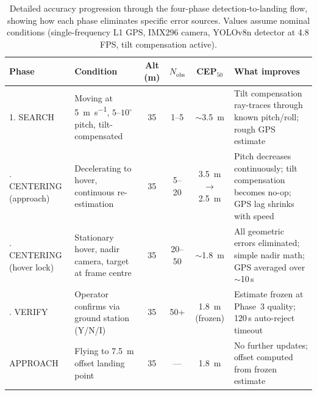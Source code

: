 \begin{table}[ht]
  \centering
  \caption{Detailed accuracy progression through the four-phase detection-to-landing flow, showing how each phase eliminates specific error sources.  Values assume nominal conditions (single-frequency L1 GPS, IMX296 camera, YOLOv8n detector at 4.8\,FPS, tilt compensation active).}
  \label{tab:state-accuracy}
  \begin{tabular}{lp{3.2cm}cccp{3.8cm}}
    \toprule
    \textbf{Phase} & \textbf{Condition} & \textbf{Alt (m)} & \textbf{$N_\mathrm{obs}$} & \textbf{CEP$_{50}$} & \textbf{What improves} \\
    \midrule
    1. SEARCH & Moving at \SI{5}{\metre\per\second}, $5$--$10^{\circ}$ pitch, tilt-compensated & 35 & 1--5 & $\sim$\SI{3.5}{\metre} & Tilt compensation ray-traces through known pitch/roll; rough GPS estimate \\
    \addlinespace
    2. CENTERING (approach) & Decelerating to hover, continuous re-estimation & 35 & 5--20 & \SI{3.5}{\metre}$\to$\SI{2.5}{\metre} & Pitch decreases continuously; tilt compensation becomes no-op; GPS lag shrinks with speed \\
    \addlinespace
    3. CENTERING (hover lock) & Stationary hover, nadir camera, target at frame centre & 35 & 20--50 & $\sim$\SI{1.8}{\metre} & All geometric errors eliminated; simple nadir math; GPS averaged over $\sim$10\,s \\
    \addlinespace
    4. VERIFY & Operator confirms via ground station (Y/N/I) & 35 & 50+ & \SI{1.8}{\metre} (frozen) & Estimate frozen at Phase~3 quality; 120\,s auto-reject timeout \\
    \addlinespace
    APPROACH & Flying to \SI{7.5}{\metre} offset landing point & 35 & --- & \SI{1.8}{\metre} & No further updates; offset computed from frozen estimate \\
    \bottomrule
  \end{tabular}
\end{table}

